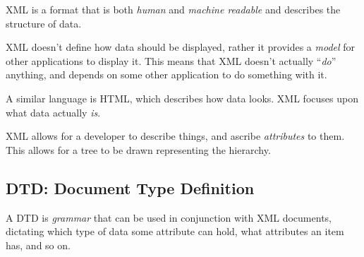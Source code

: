 \documentclass{article}
\begin{document}
XML is a format that is both \textit{human} and \textit{machine readable} and describes the structure of data.

XML doesn't define how data should be displayed, rather it provides a \textit{model} for other applications to display it. This means that XML doesn't actually ``\textit{do}'' anything, and depends on some other application to do something with it.

A similar language is HTML, which describes how data looks. XML focuses upon what data actually \textit{is}.

XML allows for a developer to describe things, and ascribe \textit{attributes} to them. This allows for a tree to be drawn representing the hierarchy.

\subsection{DTD: Document Type Definition}

A DTD is \textit{grammar} that can be used in conjunction with XML documents, dictating which type of data some attribute can hold, what attributes an item has, and so on.
\end{document}
